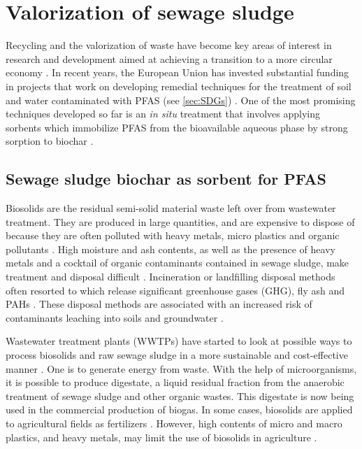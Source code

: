
\section{Valorization of sewage sludge}
Recycling and the valorization of waste have become key areas of interest in research and development aimed at achieving a transition to a more circular economy \citep{Ahmad2014}. In recent years, the European Union has invested substantial funding in projects that work on developing remedial techniques for the treatment of soil and water contaminated with PFAS (see \cref{sec:SDGs}) \citep{EC2020PFAS,ECHA2020}. One of the most promising techniques developed so far is an \textit{in situ} treatment that involves applying sorbents which immobilize PFAS from the bioavailable aqueous phase by strong sorption to biochar \citep{Ahmad2014,Sormo2021,Kupryianchyk2016b}.

\subsection{Sewage sludge biochar as sorbent for PFAS}
Biosolids are the residual semi-solid material waste left over from wastewater treatment. They are produced in large quantities, and are expensive to dispose of because they are often polluted with heavy metals, micro plastics and organic pollutants \citep{Raheem2018}. High moisture and ash contents, as well as the presence of heavy metals and a cocktail of organic contaminants contained in sewage sludge, make treatment and disposal difficult \citep{Li2019}. Incineration or landfilling disposal methods often resorted to which release significant greenhouse gases (\acrshort{GHG}), fly ash and \acrshort{PAHs} \citep{huang2022comparative}. These disposal methods are associated with an increased risk of contaminants leaching into soils and groundwater \citep{propp2021organic}. 

Wastewater treatment plants (WWTPs) have started to look at possible ways to process biosolids and raw sewage sludge in a more sustainable and cost-effective manner \citep{Raheem2018}. One is to generate energy from waste. With the help of microorganisms, it is possible to produce digestate, a liquid residual fraction from the anaerobic treatment of sewage sludge and other organic wastes. This digestate is now being used in the commercial production of biogas. In some cases, biosolids are applied to agricultural fields as fertilizers \citep{moodie2021legacy}. However, high contents of micro and macro plastics, and heavy metals, may limit the use of biosolids in agriculture \citep{mohajerani2020microplastics}.

